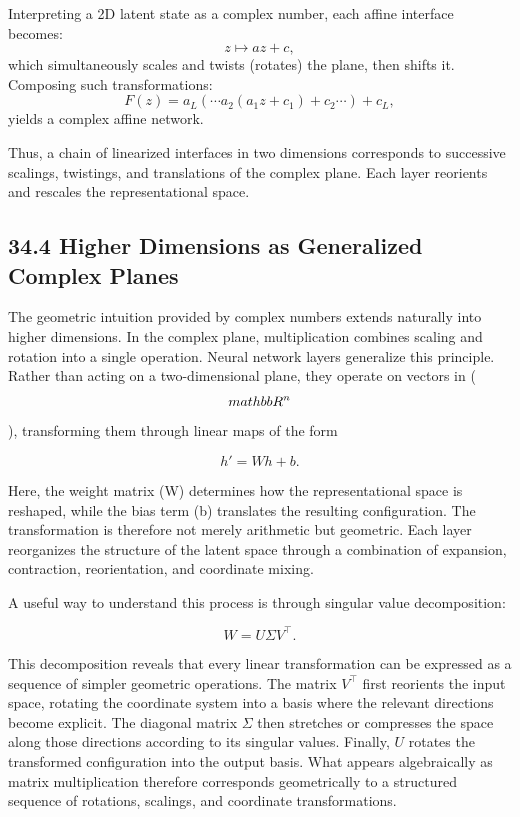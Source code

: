 \documentclass[12pt,letterpaper]{article}
\theoremstyle{remark}
\begin{document}
Interpreting a 2D latent state as a complex number, each affine interface becomes:
\[
z \mapsto a z + c,
\]
which simultaneously scales and twists (rotates) the plane, then shifts it. Composing such transformations:
\[
F(z) = a_L ( \cdots a_2 (a_1 z + c_1) + c_2 \cdots ) + c_L,
\]
yields a complex affine network.

Thus, a chain of linearized interfaces in two dimensions corresponds to successive scalings, twistings, and translations of the complex plane. Each layer reorients and rescales the representational space.

\subsection{34.4 Higher Dimensions as Generalized Complex Planes}

The geometric intuition provided by complex numbers extends naturally into higher dimensions. In the complex plane, multiplication combines scaling and rotation into a single operation. Neural network layers generalize this principle. Rather than acting on a two-dimensional plane, they operate on vectors in ($$\\mathbb{R}^n$$), transforming them through linear maps of the form

\[
h' = W h + b.
\]

Here, the weight matrix (W) determines how the representational space is reshaped, while the bias term (b) translates the resulting configuration. The transformation is therefore not merely arithmetic but geometric. Each layer reorganizes the structure of the latent space through a combination of expansion, contraction, reorientation, and coordinate mixing.

A useful way to understand this process is through singular value decomposition:

\[
W = U \Sigma V^\top.
\]

This decomposition reveals that every linear transformation can be expressed as a sequence of simpler geometric operations. The matrix $V^\top$ first reorients the input space, rotating the coordinate system into a basis where the relevant directions become explicit. The diagonal matrix $\Sigma$ then stretches or compresses the space along those directions according to its singular values. Finally, $U$ rotates the transformed configuration into the output basis. What appears algebraically as matrix multiplication therefore corresponds geometrically to a structured sequence of rotations, scalings, and coordinate transformations.
\end{document}

